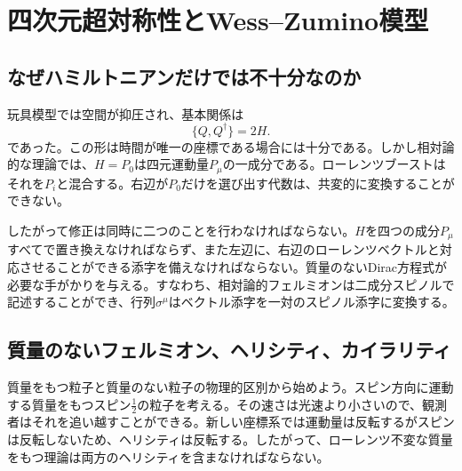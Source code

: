 \chapter{四次元超対称性とWess--Zumino模型}


\section{なぜハミルトニアンだけでは不十分なのか}

玩具模型では空間が抑圧され、基本関係は
\begin{equation}
\{Q,Q^\dagger\}=2H.
\label{eq:l8-time-only-algebra}
\end{equation}
であった。この形は時間が唯一の座標である場合には十分である。しかし相対論的な理論では、\(H=P_0\)は四元運動量\(P_\mu\)の一成分である。ローレンツブーストはそれを\(P_i\)と混合する。右辺が\(P_0\)だけを選び出す代数は、共変的に変換することができない。

したがって修正は同時に二つのことを行わなければならない。\(H\)を四つの成分\(P_\mu\)すべてで置き換えなければならず、また左辺に、右辺のローレンツベクトルと対応させることができる添字を備えなければならない。質量のないDirac方程式が必要な手がかりを与える。すなわち、相対論的フェルミオンは二成分スピノルで記述することができ、行列\(\sigma^\mu\)はベクトル添字を一対のスピノル添字に変換する。

\section{質量のないフェルミオン、ヘリシティ、カイラリティ}

質量をもつ粒子と質量のない粒子の物理的区別から始めよう。スピン方向に運動する質量をもつスピン\(\tfrac12\)の粒子を考える。その速さは光速より小さいので、観測者はそれを追い越すことができる。新しい座標系では運動量は反転するがスピンは反転しないため、ヘリシティは反転する。したがって、ローレンツ不変な質量をもつ理論は両方のヘリシティを含まなければならない。

